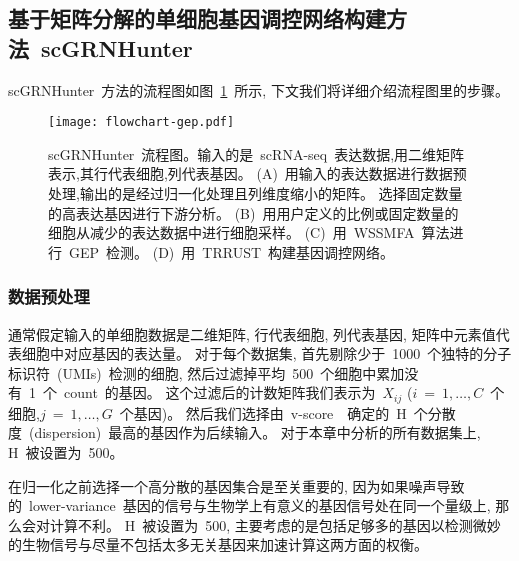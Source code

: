 \subsection{基于矩阵分解的单细胞基因调控网络构建方法~scGRNHunter}

scGRNHunter~方法的流程图如图~\ref{fig:gep-flowchart}~所示, 下文我们将详细介绍流程图里的步骤。
\begin{figure}[!htbp]
    \centering
    \texttt{[image: flowchart-gep.pdf]}
    \caption{
        scGRNHunter~流程图。输入的是~scRNA-seq~表达数据,用二维矩阵表示,其行代表细胞,列代表基因。
        (A)~用输入的表达数据进行数据预处理,输出的是经过归一化处理且列维度缩小的矩阵。
        选择固定数量的高表达基因进行下游分析。
        (B)~用用户定义的比例或固定数量的细胞从减少的表达数据中进行细胞采样。
        (C)~用~WSSMFA~算法进行~GEP~检测。
        (D)~用~TRRUST~构建基因调控网络。
    }
    \label{fig:gep-flowchart}
\end{figure}

\subsubsection{数据预处理}
通常假定输入的单细胞数据是二维矩阵, 行代表细胞, 列代表基因, 矩阵中元素值代表细胞中对应基因的表达量。
对于每个数据集, 首先剔除少于~1000~个独特的分子标识符~(UMIs)~检测的细胞,
然后过滤掉平均~500~个细胞中累加没有~1~个~count~的基因。
这个过滤后的计数矩阵我们表示为~$X_{ij}$ ($i~=~1,\ldots, C$~个细胞,$j~=~1,\ldots, G$~个基因)。
然后我们选择由~v-score~\cite{klein2015droplet}~确定的~H~个分散度~(dispersion)~最高的基因作为后续输入。
对于本章中分析的所有数据集上, H~被设置为~500。

在归一化之前选择一个高分散的基因集合是至关重要的, 
因为如果噪声导致的~lower-variance~基因的信号与生物学上有意义的基因信号处在同一个量级上, 那么会对计算不利。 
H~被设置为~500, 主要考虑的是包括足够多的基因以检测微妙的生物信号与尽量不包括太多无关基因来加速计算这两方面的权衡。

